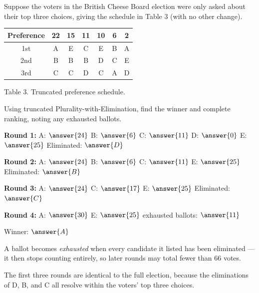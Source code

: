 \documentclass[12pt]{ximera}
\begin{document}
\begin{problem}
Suppose the voters in the British Cheese Board election were only asked about their top
three choices, giving the schedule in Table 3 (with no other change).

\begin{center}
\begin{tabular}{c|cccccc}
Preference & 22 & 15 & 11 & 10 & 6 & 2 \\\hline
1st & A & E & C & E & B & A \\
2nd & B & B & B & D & C & E \\
3rd & C & C & D & C & A & D
\end{tabular}

\smallskip
Table 3. Truncated preference schedule.
\end{center}

\begin{prompt}
Using truncated Plurality-with-Elimination, find the winner and complete ranking,
noting any exhausted ballots.

\textbf{Round 1:} A: $\answer{24}$ \quad B: $\answer{6}$ \quad C: $\answer{11}$ \quad
D: $\answer{0}$ \quad E: $\answer{25}$ \qquad Eliminated: $\answer{D}$

\smallskip
\textbf{Round 2:} A: $\answer{24}$ \quad B: $\answer{6}$ \quad C: $\answer{11}$ \quad
E: $\answer{25}$ \qquad Eliminated: $\answer{B}$

\smallskip
\textbf{Round 3:} A: $\answer{24}$ \quad C: $\answer{17}$ \quad E: $\answer{25}$
\qquad Eliminated: $\answer{C}$

\smallskip
\textbf{Round 4:} A: $\answer{30}$ \quad E: $\answer{25}$ \quad
exhausted ballots: $\answer{11}$

\smallskip
Winner: $\answer{A}$

\begin{hint}
A ballot becomes \emph{exhausted} when every candidate it listed has been eliminated ---
it then stops counting entirely, so later rounds may total fewer than $66$ votes.
\end{hint}

\begin{feedback}
The first three rounds are identical to the full election, because the eliminations of
D, B, and C all resolve within the voters' top three choices.


\end{feedback}
\end{prompt}
\end{problem}
\end{document}
